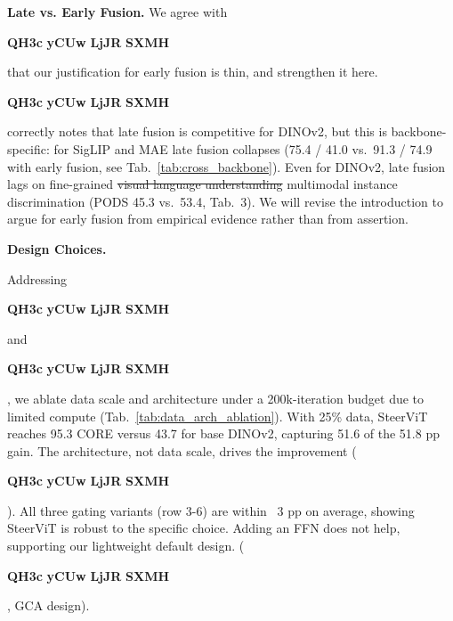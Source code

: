 \documentclass[10pt,twocolumn,letterpaper]{article}
\renewcommand{\paragraph}[1]{\vspace{1mm}\noindent\textbf{#1}}
\newcommand{\reviewertag}[2]{%
  \textcolor{#1}{\textbf{#2}}%
}
\DeclareRobustCommand{\R}[1]{%
  \ifcase#1\relax
    \PackageError{reviewers}{Reviewer number must be 1--4}{}%
  \or
    \reviewertag{revone}{QH3c}%
  \or
    \reviewertag{revtwo}{yCUw}%
  \or
    \reviewertag{revthree}{LjJR}%
  \or
    \reviewertag{revfour}{SXMH}%
  \else
    \PackageError{reviewers}{Reviewer number must be 1--4}{}%
  \fi
}
\begin{document}
\paragraph{Late vs. Early Fusion.}
We agree with \R1 that our justification for early fusion is thin, and strengthen it here.
\R3 correctly notes that late fusion is competitive for DINOv2, but this is backbone-specific: for SigLIP and MAE late fusion collapses (75.4 / 41.0 vs.\ 91.3 / 74.9 with early fusion, see Tab.~\ref{tab:cross_backbone}).
Even for DINOv2, late fusion lags on fine-grained \sout{visual language understanding} multimodal instance discrimination (PODS 45.3 vs.\ 53.4, Tab.~3).
We will revise the introduction to %
argue for early fusion from empirical evidence rather than from assertion.

\paragraph{Design Choices.}


\noindent Addressing \R1 and \R4, we ablate data scale and architecture 
under a 200k-iteration budget due to limited compute (Tab.~\ref{tab:data_arch_ablation}). 
With 25\% data, SteerViT reaches 95.3 CORE versus 43.7 for base DINOv2, capturing 51.6 of the 51.8 pp gain.
The architecture, not data scale, drives the improvement (\R4).
All three gating variants (row 3-6) are within ~3 pp on average, showing SteerViT is robust to the specific choice. 
Adding an FFN does not help, supporting our lightweight default design. (\R1, GCA design). 
\end{document}
